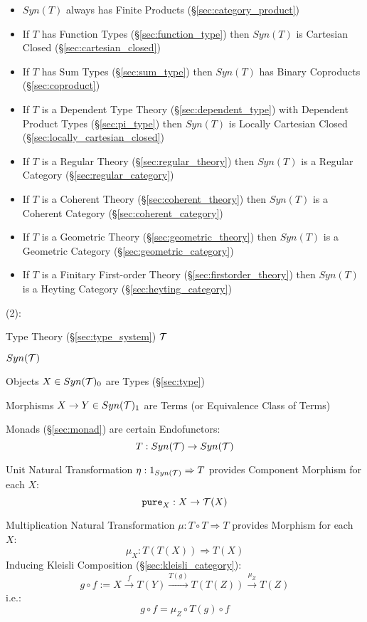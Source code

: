 \begin{itemize}
  \item $Syn(T)$ always has Finite Products
    (\S\ref{sec:category_product})
  \item If $T$ has Function Types (\S\ref{sec:function_type}) then
    $Syn(T)$ is Cartesian Closed (\S\ref{sec:cartesian_closed})
  \item If $T$ has Sum Types (\S\ref{sec:sum_type}) then $Syn(T)$ has
    Binary Coproducts (\S\ref{sec:coproduct})
  \item If $T$ is a Dependent Type Theory (\S\ref{sec:dependent_type})
    with Dependent Product Types (\S\ref{sec:pi_type}) then $Syn(T)$
    is Locally Cartesian Closed (\S\ref{sec:locally_cartesian_closed})
  \item If $T$ is a Regular Theory (\S\ref{sec:regular_theory}) then
    $Syn(T)$ is a Regular Category (\S\ref{sec:regular_category})
  \item If $T$ is a Coherent Theory (\S\ref{sec:coherent_theory}) then
    $Syn(T)$ is a Coherent Category (\S\ref{sec:coherent_category})
  \item If $T$ is a Geometric Theory (\S\ref{sec:geometric_theory}) then
    $Syn(T)$ is a Geometric Category (\S\ref{sec:geometric_category})
  \item If $T$ is a Finitary First-order Theory
    (\S\ref{sec:firstorder_theory}) then $Syn(T)$ is a Heyting
    Category (\S\ref{sec:heyting_category})
\end{itemize}

(2):

Type Theory (\S\ref{sec:type_system}) $\mathcal{T}$

$Syn(\mathcal{T})$

Objects $X \in Syn(\mathcal{T})_0$ are Types (\S\ref{sec:type})

Morphisms $X \rightarrow Y \in Syn(\mathcal{T})_1$ are Terms (or Equivalence
Class of Terms)

Monads (\S\ref{sec:monad}) are certain Endofunctors:
\[
  T : Syn(\mathcal{T}) \rightarrow Syn(\mathcal{T})
\]

Unit Natural Transformation $\eta : 1_{Syn(\mathcal{T})} \Rightarrow T$
provides Component Morphism for each $X$:
\[
  \mathtt{pure}_X : X \rightarrow \mathcal{T}(X)
\]

Multiplication Natural Transformation $\mu : T \circ T \Rightarrow T$
provides Morphism for each $X$:
\[
  \mu_X : T(T(X)) \Rightarrow T(X)
\]
Inducing Kleisli Composition (\S\ref{sec:kleisli_category}):
\[
  g \circ f := X \xrightarrow{f} T(Y) \xrightarrow{T(g)} T(T(Z))
  \xrightarrow{\mu_Z} T(Z)
\]
i.e.:
\[
  g \circ f = \mu_Z \circ T(g) \circ f
\]



